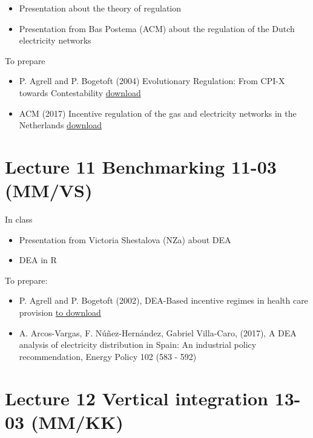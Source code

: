 \documentclass[]{book}
\providecommand{\tightlist}{%
  \setlength{\itemsep}{0pt}\setlength{\parskip}{0pt}}
\begin{document}
\begin{itemize}
\tightlist
\item
  Presentation about the theory of regulation
\item
  Presentation from Bas Postema (ACM) about the regulation of the Dutch
  electricity networks
\end{itemize}

To prepare

\begin{itemize}
\item
  P. Agrell and P. Bogetoft (2004) Evolutionary Regulation: From CPI-X
  towards Contestability
  \href{https://www.sumicsid.com/reg/papers/encore.pdf}{download}
\item
  ACM (2017) Incentive regulation of the gas and electricity networks in
  the Netherlands
  \href{https://www.acm.nl/sites/default/files/old_publication/publicaties/17231_incentive-regulation-of-the-gas-and-elektricity-networks-in-the-netherlands-2017-05-17.pdf}{download}
\end{itemize}

\section{Lecture 11 Benchmarking 11-03
(MM/VS)}\label{lecture-11-benchmarking-11-03-mmvs}

In class

\begin{itemize}
\tightlist
\item
  Presentation from Victoria Shestalova (NZa) about DEA
\item
  DEA in R
\end{itemize}

To prepare:

\begin{itemize}
\tightlist
\item
  P. Agrell and P. Bogetoft (2002), DEA-Based incentive regimes in
  health care provision
  \href{https://www.researchgate.net/profile/Peter_Bogetoft/publication/23515165_DEA-Based_Incentive_Regimes_in_Health-Care_Provision/links/0912f50ae2f961fe8b000000.pdf}{to
  download}
\item
  A. Arcos-Vargas, F. Núñez-Hernández, Gabriel Villa-Caro, (2017), A DEA
  analysis of electricity distribution in Spain: An industrial policy
  recommendation, Energy Policy 102 (583 - 592)
\end{itemize}

\section{Lecture 12 Vertical integration 13-03
(MM/KK)}\label{lecture-12-vertical-integration-13-03-mmkk}
\end{document}

